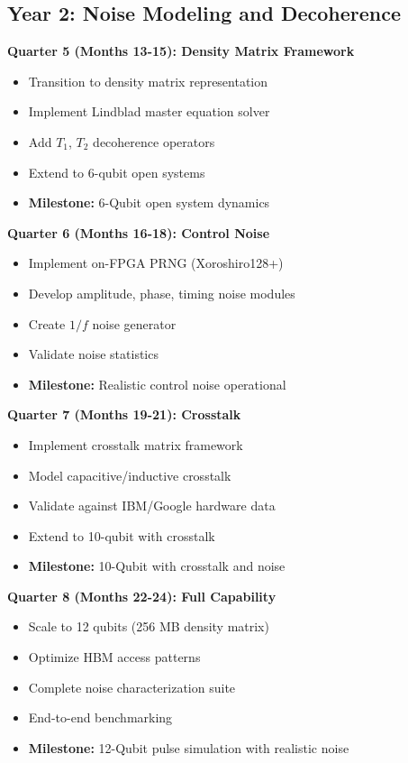 \documentclass[12pt,a4paper]{article}
\begin{document}
\subsection{Year 2: Noise Modeling and Decoherence}

\textbf{Quarter 5 (Months 13-15): Density Matrix Framework}
\begin{itemize}[noitemsep]
    \item Transition to density matrix representation
    \item Implement Lindblad master equation solver
    \item Add $T_1$, $T_2$ decoherence operators
    \item Extend to 6-qubit open systems
    \item \textbf{Milestone:} 6-Qubit open system dynamics
\end{itemize}

\textbf{Quarter 6 (Months 16-18): Control Noise}
\begin{itemize}[noitemsep]
    \item Implement on-FPGA PRNG (Xoroshiro128+)
    \item Develop amplitude, phase, timing noise modules
    \item Create $1/f$ noise generator
    \item Validate noise statistics
    \item \textbf{Milestone:} Realistic control noise operational
\end{itemize}

\textbf{Quarter 7 (Months 19-21): Crosstalk}
\begin{itemize}[noitemsep]
    \item Implement crosstalk matrix framework
    \item Model capacitive/inductive crosstalk
    \item Validate against IBM/Google hardware data
    \item Extend to 10-qubit with crosstalk
    \item \textbf{Milestone:} 10-Qubit with crosstalk and noise
\end{itemize}

\textbf{Quarter 8 (Months 22-24): Full Capability}
\begin{itemize}[noitemsep]
    \item Scale to 12 qubits (256 MB density matrix)
    \item Optimize HBM access patterns
    \item Complete noise characterization suite
    \item End-to-end benchmarking
    \item \textbf{Milestone:} 12-Qubit pulse simulation with realistic noise
\end{itemize}
\end{document}
